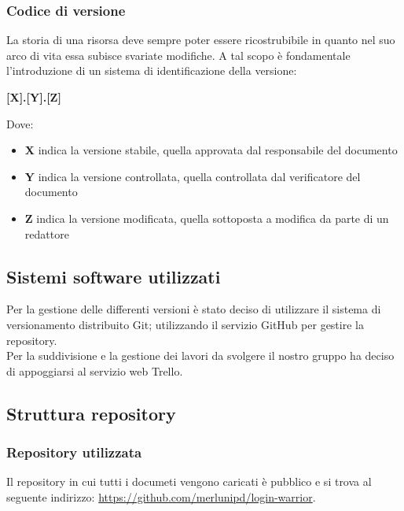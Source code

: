    \subsubsection{Codice di versione}
   La storia di una risorsa deve sempre poter essere ricostrubibile in quanto nel suo arco di vita essa subisce
   svariate modifiche. A tal scopo è fondamentale l'introduzione di un sistema di identificazione della 
   versione: 
   \begin{center}
       \textbf{[X].[Y].[Z]}
   \end{center}
   Dove:
   \begin{itemize}
       \item \textbf{X} indica la versione stabile, quella approvata dal responsabile del documento
       \item \textbf{Y} indica la versione controllata, quella controllata dal verificatore del documento
       \item \textbf{Z} indica la versione modificata, quella sottoposta a modifica da parte di un redattore
   \end{itemize}


 \subsection{Sistemi software utilizzati}
 Per la gestione delle differenti versioni è stato deciso di utilizzare il sistema
 di versionamento distribuito Git; utilizzando il servizio GitHub per gestire la repository.\\
 Per la suddivisione e la gestione dei lavori da svolgere il nostro gruppo ha deciso di appoggiarsi
 al servizio web Trello.\\

 \subsection{Struttura repository}
  \subsubsection{Repository utilizzata}
  Il repository in cui tutti i documeti vengono caricati è pubblico e si trova al seguente indirizzo: 
  \url{https://github.com/merlunipd/login-warrior}.
    
